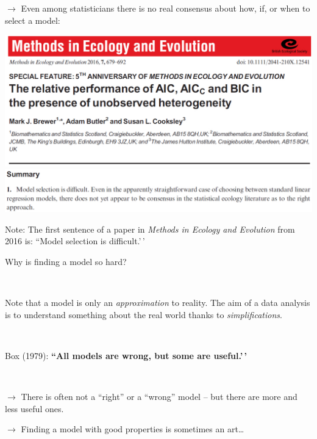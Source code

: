 \documentclass[
  10pt,
  ignorenonframetext,
]{beamer}
\begin{document}
\begin{frame}
\(\rightarrow\) Even among statisticians there is no real consensus
about how, if, or when to select a model:

\includegraphics{graphics/brewer_title.jpg}
\includegraphics{graphics/brewer.jpg}

Note: The first sentence of a paper in \emph{Methods in Ecology and
Evolution} from 2016 is: ``Model selection is difficult.'\,'
\end{frame}

\begin{frame}
Why is finding a model so hard?

\(~\)

Note that a model is only an \emph{approximation} to reality. The aim of
a data analysis is to understand something about the real world thanks
to \emph{simplifications}.

\(~\)

Box (1979): \textbf{``All models are wrong, but some are useful.'\,'}

\(~\)

\(\rightarrow\) There is often not a ``right'' or a ``wrong'' model --
but there are more and less useful ones.

\(\rightarrow\) Finding a model with good properties is sometimes an
art\ldots{}
\end{frame}
\end{document}
